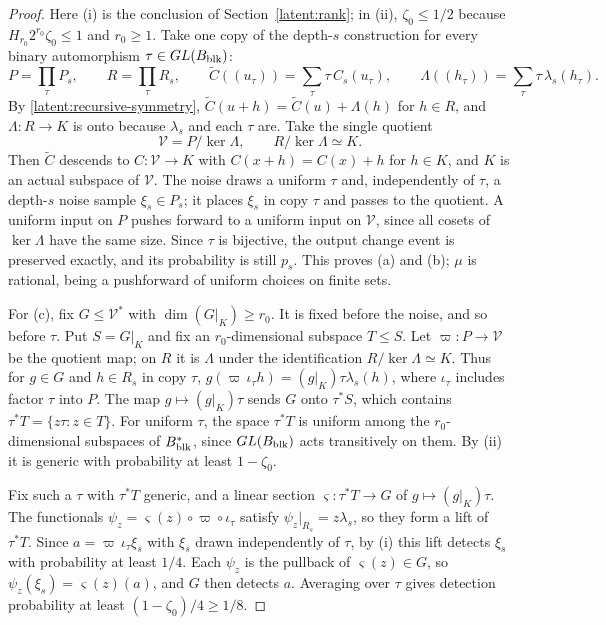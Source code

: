 \documentclass[11pt]{article}
\begin{document}
\begin{proof}
Here (i) is the conclusion of Section~\ref{latent:rank}; in (ii),
$\zeta_0\le1/2$ because $H_{r_0}2^{r_0}\zeta_0\le1$ and $r_0\ge1$.
Take one copy of the depth-$s$
construction for every binary automorphism $\tau\in GL(B_{\rm blk})$:
\[
 P=\prod_{\tau}P_s,\qquad R=\prod_{\tau}R_s,\qquad
 \widetilde C((u_\tau))=\sum_{\tau}\tau\,C_s(u_\tau),\qquad
 \Lambda((h_\tau))=\sum_{\tau}\tau\,\lambda_s(h_\tau).
\]
By \eqref{latent:recursive-symmetry},
$\widetilde C(u+h)=\widetilde C(u)+\Lambda(h)$ for $h\in R$, and
$\Lambda:R\to K$ is onto because $\lambda_s$ and each $\tau$ are. Take the
single quotient
\[
 \mathcal V=P/\ker\Lambda,\qquad R/\ker\Lambda\simeq K.
\]
Then $\widetilde C$ descends to $C:\mathcal V\to K$ with $C(x+h)=C(x)+h$
for $h\in K$, and $K$ is an actual subspace of $\mathcal V$. The noise
draws a uniform $\tau$ and, independently of $\tau$, a depth-$s$ noise
sample $\xi_s\in P_s$; it places $\xi_s$ in copy $\tau$ and passes to the quotient. A uniform input
on $P$ pushes forward to a uniform input on $\mathcal V$, since all cosets of
$\ker\Lambda$ have the same size. Since $\tau$ is bijective, the output
change event is preserved exactly, and its probability is still $p_s$.
This proves (a) and (b); $\mu$ is rational, being a pushforward of
uniform choices on finite sets.

For (c), fix $G\le\mathcal V^*$ with $\dim(G|_K)\ge r_0$. It is fixed
before the noise, and so before $\tau$. Put $S=G|_K$ and fix an
$r_0$-dimensional subspace $T\le S$. Let $\varpi:P\to\mathcal V$ be the
quotient map; on $R$ it is $\Lambda$ under the identification
$R/\ker\Lambda\simeq K$. Thus for $g\in G$ and $h\in R_s$ in copy $\tau$,
$g(\varpi\,\iota_\tau h)=(g|_K)\tau\lambda_s(h)$, where $\iota_\tau$
includes factor $\tau$ into $P$. The map $g\mapsto(g|_K)\tau$ sends $G$
onto $\tau^*S$, which contains $\tau^*T=\{z\tau:z\in T\}$. For uniform
$\tau$, the space $\tau^*T$ is uniform among the $r_0$-dimensional
subspaces of $B_{\rm blk}^*$, since $GL(B_{\rm blk})$ acts transitively
on them. By (ii) it is generic with probability at least $1-\zeta_0$.

Fix such a $\tau$ with $\tau^*T$ generic, and a linear section
$\varsigma:\tau^*T\to G$ of $g\mapsto(g|_K)\tau$. The functionals
$\psi_z=\varsigma(z)\circ\varpi\circ\iota_\tau$ satisfy
$\psi_z|_{R_s}=z\lambda_s$, so they form a lift of $\tau^*T$. Since
$a=\varpi\,\iota_\tau\xi_s$ with $\xi_s$ drawn independently of $\tau$, by
(i) this lift detects $\xi_s$ with probability at least $1/4$. Each
$\psi_z$ is the pullback of $\varsigma(z)\in G$, so
$\psi_z(\xi_s)=\varsigma(z)(a)$, and $G$ then detects $a$. Averaging over $\tau$
gives detection probability at least $(1-\zeta_0)/4\ge1/8$.
\end{proof}
\end{document}
